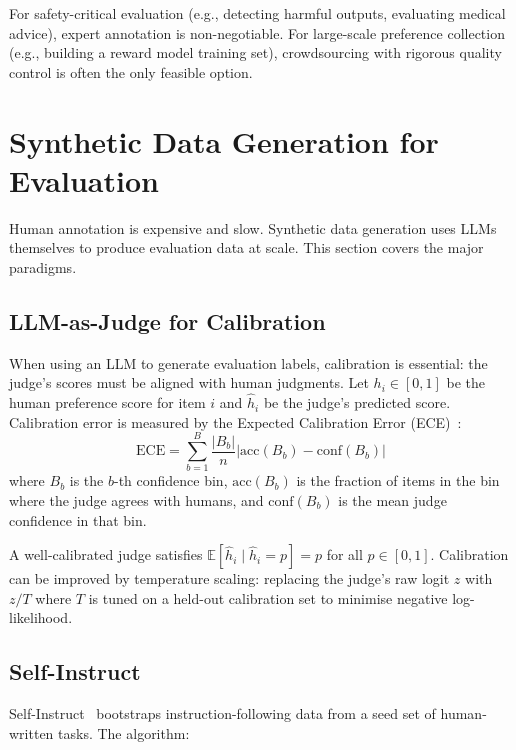 For safety-critical evaluation (e.g., detecting harmful outputs, evaluating medical advice), expert annotation is non-negotiable. For large-scale preference collection (e.g., building a reward model training set), crowdsourcing with rigorous quality control is often the only feasible option.

\section{Synthetic Data Generation for Evaluation}
\label{subsec:synthetic-data}

Human annotation is expensive and slow. Synthetic data generation uses LLMs themselves to produce evaluation data at scale. This section covers the major paradigms.

\subsection{LLM-as-Judge for Calibration}
\label{llm-as-judge-for-calibration}

When using an LLM to generate evaluation labels, calibration is essential: the judge’s scores must be aligned with human judgments. Let $h_i \in [0,1]$ be the human preference score for item $i$ and $\hat{h}_i$ be the judge’s predicted score. Calibration error is measured by the Expected Calibration Error (ECE)~\cite{guo2017calibration}: 
\begin{equation}
    \text{ECE} = \sum_{b=1}^{B} \frac{|B_b|}{n} \left| \text{acc}(B_b) - \text{conf}(B_b) \right|
\end{equation}
 where $B_b$ is the $b$-th confidence bin, $\text{acc}(B_b)$ is the fraction of items in the bin where the judge agrees with humans, and $\text{conf}(B_b)$ is the mean judge confidence in that bin.

A well-calibrated judge satisfies $\mathbb{E}[\hat{h}_i \mid \hat{h}_i = p] = p$ for all $p \in [0,1]$. Calibration can be improved by temperature scaling: replacing the judge’s raw logit $z$ with $z/T$ where $T$ is tuned on a held-out calibration set to minimise negative log-likelihood.

\subsection{Self-Instruct}
\label{self-instruct}

Self-Instruct~\cite{wang2022selfinstruct} bootstraps instruction-following data from a seed set of human-written tasks. The algorithm:

